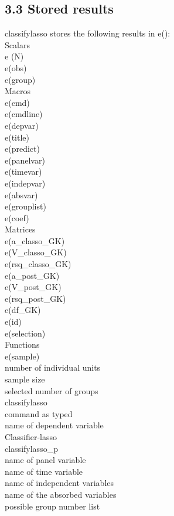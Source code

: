 \documentclass[10pt]{article}
\begin{document}
\subsection*{3.3 Stored results}
classifylasso stores the following results in e():\\
Scalars\\
e (N)\\
e(obs)\\
e(group)\\
Macros\\
e(cmd)\\
e(cmdline)\\
e(depvar)\\
e(title)\\
e(predict)\\
e(panelvar)\\
e(timevar)\\
e(indepvar)\\
e(absvar)\\
e(grouplist)\\
e(coef)\\
Matrices\\
e(a\_classo\_GK)\\
e(V\_classo\_GK)\\
e(rsq\_classo\_GK)\\
e(a\_post\_GK)\\
e(V\_post\_GK)\\
e(rsq\_post\_GK)\\
e(df\_GK)\\
e(id)\\
e(selection)\\
Functions\\
e(sample)\\
number of individual units\\
sample size\\
selected number of groups\\
classifylasso\\
command as typed\\
name of dependent variable\\
Classifier-lasso\\
classifylasso\_p\\
name of panel variable\\
name of time variable\\
name of independent variables\\
name of the absorbed variables\\
possible group number list\\
\end{document}
